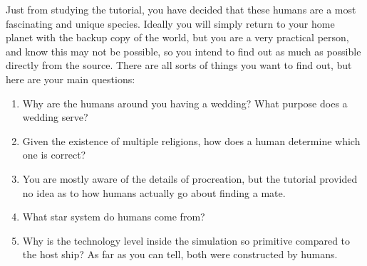 \documentclass[char]{guildcamp1}
\begin{document}
Just from studying the tutorial, you have decided that these humans are a most fascinating and unique species. Ideally you will simply return to your home planet with the backup copy of the world, but you are a very practical person, and know this may not be possible, so you intend to find out as much as possible directly from the source. There are all sorts of things you want to find out, but here are your main questions:

\begin{enumerate}
\item Why are the humans around you having a wedding? What purpose does a wedding serve?
\item Given the existence of multiple religions, how does a human determine which one is correct?
\item You are mostly aware of the details of procreation, but the tutorial provided no idea as to how humans actually go about finding a mate.
\item What star system do humans come from?
\item Why is the technology level inside the simulation so primitive compared to the host ship? As far as you can tell, both were constructed by humans.
\end{enumerate}

\end{document}
